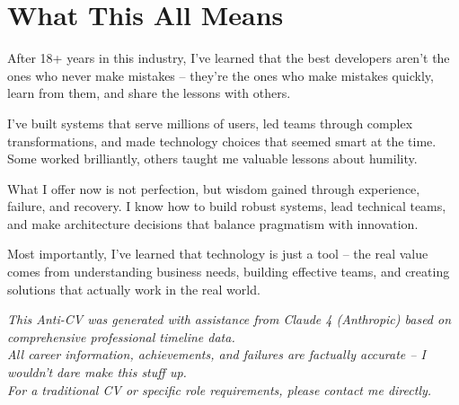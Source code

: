 \documentclass[10pt,a4paper]{article}
\begin{document}
\section{What This All Means}

After 18+ years in this industry, I've learned that the best developers aren't the ones who never make mistakes -- they're the ones who make mistakes quickly, learn from them, and share the lessons with others.

I've built systems that serve millions of users, led teams through complex transformations, and made technology choices that seemed smart at the time. Some worked brilliantly, others taught me valuable lessons about humility.

What I offer now is not perfection, but wisdom gained through experience, failure, and recovery. I know how to build robust systems, lead technical teams, and make architecture decisions that balance pragmatism with innovation.

Most importantly, I've learned that technology is just a tool -- the real value comes from understanding business needs, building effective teams, and creating solutions that actually work in the real world.

\vfill

\begin{center}
\footnotesize
\textit{This Anti-CV was generated with assistance from Claude 4 (Anthropic) based on comprehensive professional timeline data.}\\
\textit{All career information, achievements, and failures are factually accurate -- I wouldn't dare make this stuff up.}\\
\textit{For a traditional CV or specific role requirements, please contact me directly.}
\end{center}
\end{document}
